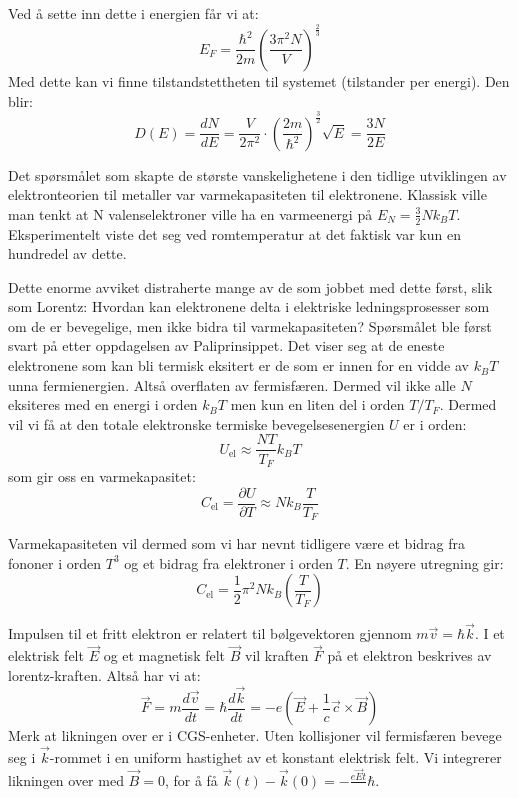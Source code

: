 \documentclass{article}
\begin{document}
 Ved å sette inn dette i energien får vi at:
 \begin{equation}
     E_F = \frac{\hbar^2}{2m} \left(\frac{3 \pi^2 N}{V}\right)^{\frac{2}{3}}
 \end{equation}
Med dette kan vi finne tilstandstettheten til systemet (tilstander per energi). Den blir:
\begin{equation}
    D(E) = \frac{dN}{dE} = \frac{V}{2\pi^2} \cdot \left(\frac{2m}{\hbar^2}\right)^{\frac{3}{2}} \sqrt{E} = \frac{3N}{2E}
\end{equation}

Det spørsmålet som skapte de største vanskelighetene i den tidlige utviklingen av elektronteorien til metaller var varmekapasiteten til elektronene. Klassisk ville man tenkt at N valenselektroner ville ha en varmeenergi på $E_N = \frac{3}{2} N k_B T$. Eksperimentelt viste det seg ved romtemperatur at det faktisk var kun en hundredel av dette.

Dette enorme avviket distraherte mange av de som jobbet med dette først, slik som Lorentz: Hvordan kan elektronene delta i elektriske ledningsprosesser som om de er bevegelige, men ikke bidra til varmekapasiteten? Spørsmålet ble først svart på etter oppdagelsen av Paliprinsippet. Det viser seg at de eneste elektronene som kan bli termisk eksitert er de som er innen for en vidde av $k_BT$ unna fermienergien. Altså overflaten av fermisfæren. Dermed vil ikke alle $N$ eksiteres med en energi i orden $k_B T$ men kun en liten del i orden $T / T_F$. Dermed vil vi få at den totale elektronske termiske bevegelsesenergien $U$ er i orden:
\begin{equation}
    U_{\text{el}} \approx \frac{N T}{T_F} k_B T
\end{equation}
som gir oss en varmekapasitet:
\begin{equation}
    C_{\text{el}} = \frac{\partial U}{\partial T} \approx N k_B \frac{T}{T_F}
\end{equation}

Varmekapasiteten vil dermed som vi har nevnt tidligere være et bidrag fra fononer i orden $T^3$ og et bidrag fra elektroner i orden $T$.
En nøyere utregning gir:
\begin{equation}
\label{eq:termisk_varmekapasitet_fermigass}
    C_{\text{el}} = \frac{1}{2} \pi^2 N k_B \left(\frac{T}{T_F} \right)
\end{equation}

Impulsen til et fritt elektron er relatert til bølgevektoren gjennom $m \vec{v} = \hbar \vec{k}$. I et elektrisk felt $\vec{E}$ og et magnetisk felt $\vec{B}$ vil kraften $\vec{F}$ på et elektron beskrives av lorentz-kraften. Altså har vi at:
\begin{equation}
    \vec{F}= m \frac{d \vec{v}}{dt} = \hbar \frac{d \vec{k}}{dt} = -e \left(\vec{E} + \frac{1}{c} \vec{c} \times \vec{B}\right)
\end{equation}
Merk at likningen over er i CGS-enheter. Uten kollisjoner vil fermisfæren bevege seg i $\vec{k}$-rommet i en uniform hastighet av et konstant elektrisk felt. Vi integrerer likningen over med $\vec{B}= 0$, for å få $\vec{k}(t) - \vec{k}(0) = -\frac{e \vec{E} t }{}\hbar$.
\end{document}
